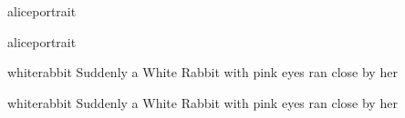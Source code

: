 \documentclass[
a5paper,
]{scrbook}
\begin{document}
\frontmatter
\begin{pictures}
\pagestyle{empty}


\clearpage
\end{pictures}

	\pagestyle{plain}
\begin{pictures}
	\begin{letter}
		\begin{colorbigpic}
			[0.9]
			{aliceportrait}
			{}
		\end{colorbigpic}
	\end{letter}
	
	\begin{a4}
		\begin{colorbigpic}
			[0.8]
			{aliceportrait}
			{}
		\end{colorbigpic}	
	\end{a4}	
	\clearpage
\end{pictures}
\tableofcontents


{}

 
\cleardoubleevenpage
\begin{pictures}
	\begin{letter}
		\begin{colorbigpic}
			[1.1]
			{whiterabbit}
			{Suddenly a White Rabbit with pink eyes ran close by her}
		\end{colorbigpic}
	\end{letter}
	
	\begin{a4}
		\begin{colorbigpic}
			[1.0]
			{whiterabbit}
			{Suddenly a White Rabbit with pink eyes ran close by her}
		\end{colorbigpic}	
	\end{a4}
\end{pictures}

\mainmatter
\pagestyle{headings}


















\renewcommand*{\chapterheadendvskip}{\vfill}
\renewcommand*{\chapterheadstartvskip}{\vfill}
\end{document}
